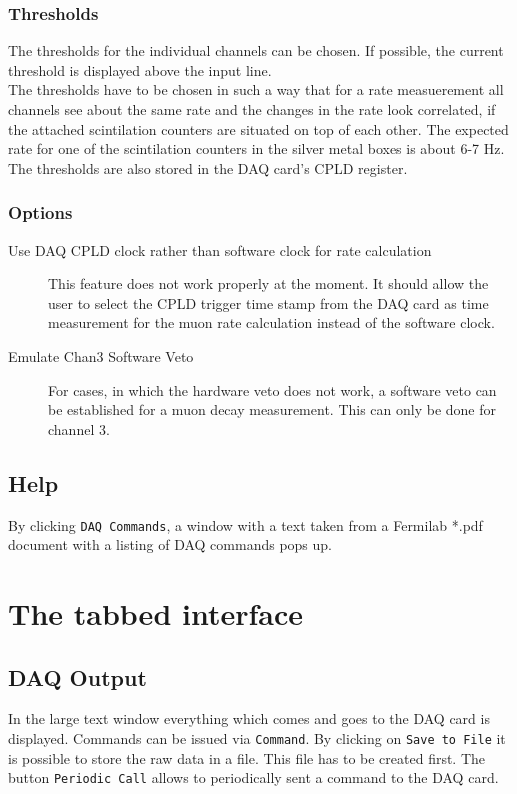 \documentclass[a4paper,12pt]{article}
\begin{document}
\subsubsection{Thresholds}
The thresholds for the individual channels can be chosen. If possible, the current threshold is displayed above the input line.\\
The thresholds have to be chosen in such a way that for a rate measuerement all channels see about the same rate and the changes in the rate look correlated, if the attached scintilation counters are situated on top of each other. The expected rate for one of the scintilation counters in the silver metal boxes is about 6-7 Hz.
The thresholds are also stored in the DAQ card's CPLD register.

\subsubsection{Options}
\begin{description}
\item[Use DAQ CPLD clock rather than software clock for rate calculation]
This feature does not work properly at the moment. It should allow the user to select the CPLD trigger time stamp from the DAQ card as time measurement for the muon rate calculation instead of the software clock.
\item[Emulate Chan3 Software Veto] For cases, in which the hardware veto does not work, a software veto can be established for a muon decay measurement. This can only be done for channel 3.
\end{description}
\subsection{Help}
By clicking \verb|DAQ Commands|, a window with a text taken from a Fermilab *.pdf document with a listing of DAQ commands pops up.
\section{The tabbed interface}
\subsection{DAQ Output}
In the large text window everything which comes and goes to the DAQ card is displayed.
Commands can be issued via \verb|Command|. By clicking on  \verb|Save to File| it is possible to store the raw data in a file. This file has to be created first.
The button \verb|Periodic Call| allows to periodically sent a command to the DAQ card. 
\end{document}
